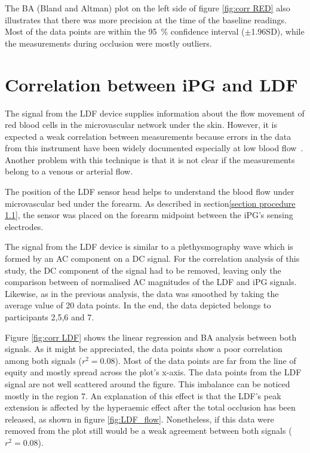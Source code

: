The BA (Bland and Altman) plot on the left side of figure \ref{fig:corr RED} also illustrates that there was more precision at the time of the baseline readings. Most of the data points are within the \SI{95}{\percent} confidence interval ($\pm $1.96SD), while the measurements during occlusion were mostly outliers.

\section{Correlation between iPG and LDF}  %
\label{section correlation 4}
The signal from the LDF device supplies information about the flow movement of red blood cells in the microvascular network under the skin. However, it is expected a weak correlation between measurements because errors in the data from this instrument have been widely documented especially at low blood flow~\cite{perkash1988difficulties}. Another problem with this technique is that it is not clear if the measurements belong to a venous or arterial flow. 

The position of the LDF sensor head helps to understand the blood flow under microvascular bed under the forearm. As described in section\ref{section procedure 1.1}, the sensor was placed on the forearm midpoint between the iPG's sensing electrodes. 

The signal from the LDF device is similar to a plethysmography wave which is formed by an AC component on a DC signal. For the correlation analysis of this study, the DC component of the signal had to be removed, leaving only the comparison between of normalised AC magnitudes of the LDF and iPG signals. Likewise, as in the previous analysis, the data was smoothed by taking the average value of 20 data points. In the end, the data depicted belongs to participants 2,5,6 and 7.

Figure \ref{fig:corr LDF} shows the linear regression and  BA analysis between both signals. As it might be appreciated, the data points show a poor correlation among both signals ($r^2 = 0.08$). Most of the data points are far from the line of equity and mostly spread across the plot's x-axis. The data points from the LDF signal are not well scattered around the figure. This imbalance can be noticed mostly in the region 7.  An explanation of this effect is that the LDF's peak extension is affected by the hyperaemic effect after the total occlusion has been released, as shown in figure \ref{fig:LDF_flow}. Nonetheless, if this data were removed from the plot still would be a weak agreement between both signals ($r^2 = 0.08$).


